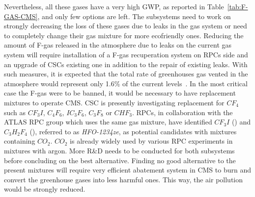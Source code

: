 	Nevertheless, all these gases have a very high GWP, as reported in Table~\ref{tab:F-GAS-CMS}, and only few options are left. The subsystems need to work on strongly decreasing the loss of these gases due to leaks in the gas system or need to completely change their gas mixture for more ecofriendly ones. Reducing the amount of F-gas released in the atmosphere due to leaks on the current gas system will require installation of a F-gas recuperation system on RPCs side and an upgrade of CSCs existing one in addition to the repair of existing leaks. With such measures, it is expected that the total rate of greenhouses gas vented in the atmosphere would represent only 1.6\% of the current levels~\cite{PHASEIITP}. In the most critical case the F-gas were to be banned, it would be necessary to have replacement mixtures to operate CMS. CSC is presently investigating replacement for $CF_4$ such as $CF_3I$, $C_4F_6$, $IC_3F_6$, $C_3F_8$ or $CHF_3$. RPCs, in collaboration with the ATLAS RPC group which uses the same gas mixture, have identified $CF_3I$ () and $C_3H_2F_4$ (), referred to as \textit{HFO-1234ze}, as potential candidates with mixtures containing $CO_2$. $CO_2$ is already widely used by various RPC experiments in mixtures with argon. More R\&D needs to be conducted for both subsystems before concluding on the best alternative. Finding no good alternative to the present mixtures will require very efficient abatement system in CMS to burn and convert the greenhouse gases into less harmful ones. This way, the air pollution would be strongly reduced.
	
